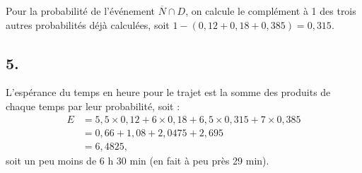 \documentclass[10pt]{article}
\begin{document}
Pour la probabilité de l'événement \(\overline{N} \cap D\), on calcule le complément à 1 des trois autres probabilités déjà calculées, soit \(1 - (0{,}12 + 0{,}18 + 0{,}385) = 0{,}315\).

\subsection*{5.}

L'espérance du temps en heure pour le trajet est la somme des produits de chaque temps par leur probabilité, soit :
\begin{align*}
E &= 5{,}5 \times 0{,}12 + 6 \times 0{,}18 + 6{,}5 \times 0{,}315 + 7 \times 0{,}385 \\
&= 0{,}66 + 1{,}08 + 2{,}0475 + 2{,}695 \\
&= 6{,}4825,
\end{align*}
soit un peu moins de 6 h 30 min (en fait à peu près 29 min).
\end{document}
